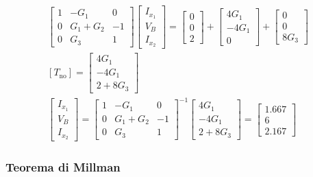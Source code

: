 \documentclass{article}
\numberwithin{equation}{subsection}
\begin{document}
\begin{gather*}
    \begin{bmatrix}
        1&-G_1&0\\0&G_1+G_2&-1\\0&G_3&1
    \end{bmatrix}\begin{bmatrix}
        I_{x_1}\\V_B\\I_{x_2}
    \end{bmatrix}=\begin{bmatrix}
        0\\0\\2
    \end{bmatrix}+\begin{bmatrix}
        4G_1\\-4G_1\\0
    \end{bmatrix}+\begin{bmatrix}
        0\\0\\8G_3
    \end{bmatrix}\\
    [T_\mathrm{no}]=\begin{bmatrix}
        4G_1\\-4G_1\\2+8G_3
    \end{bmatrix}\\
    \begin{bmatrix}
        I_{x_1}\\V_B\\I_{x_2}
    \end{bmatrix}=\begin{bmatrix}
        1&-G_1&0\\0&G_1+G_2&-1\\0&G_3&1
    \end{bmatrix}^{-1}\begin{bmatrix}
        4G_1\\-4G_1\\2+8G_3
    \end{bmatrix}=\begin{bmatrix}
        1.667\\
        6\\
        2.167
    \end{bmatrix}
\end{gather*}

\subsubsection{Teorema di Millman}
\end{document}
